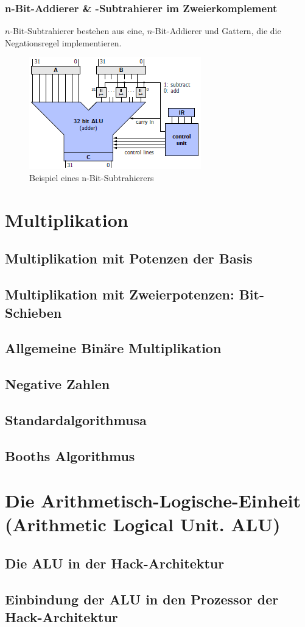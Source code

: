 \documentclass[12pt]{report}
\begin{document}
\subsubsection{n-Bit-Addierer \& -Subtrahierer im Zweierkomplement}
\begin{defbox}
  $n$-Bit-Subtrahierer bestehen aus eine, $n$-Bit-Addierer und Gattern, 
  die die Negationsregel implementieren.
  
\end{defbox}

\begin{figure}[h]
  \caption{Beispiel eines n-Bit-Subtrahierers}
  \centering
  \includegraphics{graphics/n-bit-subtrahierer.png}
\end{figure}

\section{Multiplikation}
\subsection{Multiplikation mit Potenzen der Basis}
\subsection{Multiplikation mit Zweierpotenzen: Bit-Schieben}
\subsection{Allgemeine Binäre Multiplikation}
\subsection{Negative Zahlen}
\subsection{Standardalgorithmusa}
\subsection{Booths Algorithmus}


\section{Die Arithmetisch-Logische-Einheit (Arithmetic Logical Unit. ALU)}
\subsection{Die ALU in der Hack-Architektur}
\subsection{Einbindung der ALU in den Prozessor der Hack-Architektur}
\end{document}
